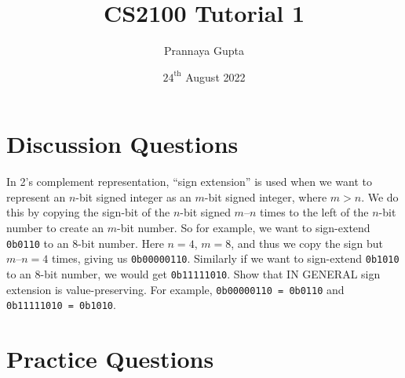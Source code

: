 \documentclass[a4paper, 12pt, addpoints]{exam}
\title{CS2100 \textbf{Tutorial 1}}
\author{Prannaya Gupta}
\date{$24^{\text{th}}$ August 2022}
\begin{document}
\maketitle


\section{Discussion Questions}
\begin{questions}
\question In 2’s complement representation, “sign extension” is used when we want to represent an $n$-bit signed integer as an $m$-bit signed integer, where $m > n$. We do this by copying the sign-bit of the $n$-bit signed $m – n$ times to the left of the $n$-bit number to create an $m$-bit number. So for example, we want to sign-extend \texttt{0b0110} to an 8-bit number. Here $n = 4$, $m = 8$, and thus we copy the sign but $m – n = 4$ times, giving us \texttt{0b00000110}. Similarly if we want to sign-extend \texttt{0b1010} to an 8-bit number, we would get \texttt{0b11111010}. Show that IN GENERAL sign extension is value-preserving. For example, \texttt{0b00000110 = 0b0110} and \texttt{0b11111010 = 0b1010}.

\end{questions}
\newpage

\section{Practice Questions}

\begin{questions}
\question 

\end{questions}
\end{document}
